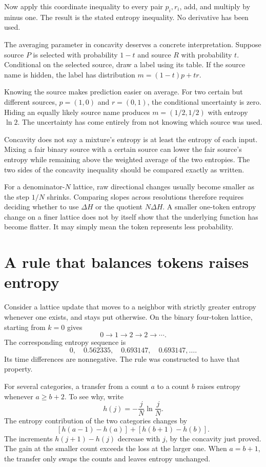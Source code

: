 \documentclass[11pt,oneside,openany]{book}
\theoremstyle{definition}
\theoremstyle{remark}
\numberwithin{equation}{chapter}
\begin{document}
Now apply this coordinate inequality to every pair \(p_i,r_i\), add, and multiply by minus one. The result is the stated entropy inequality. No derivative has been used.

The averaging parameter in concavity deserves a concrete interpretation. Suppose source \(P\) is selected with probability \(1-t\) and source \(R\) with probability \(t\). Conditional on the selected source, draw a label using its table. If the source name is hidden, the label has distribution \(m=(1-t)p+tr\).

Knowing the source makes prediction easier on average. For two certain but different sources, \(p=(1,0)\) and \(r=(0,1)\), the conditional uncertainty is zero. Hiding an equally likely source name produces \(m=(1/2,1/2)\) with entropy \(\ln2\). The uncertainty has come entirely from not knowing which source was used.

Concavity does not say a mixture's entropy is at least the entropy of each input. Mixing a fair binary source with a certain source can lower the fair source's entropy while remaining above the weighted average of the two entropies. The two sides of the concavity inequality should be compared exactly as written.

For a denominator-\(N\) lattice, raw directional changes usually become smaller as the step \(1/N\) shrinks. Comparing slopes across resolutions therefore requires deciding whether to use \(\Delta H\) or the quotient \(N\Delta H\). A smaller one-token entropy change on a finer lattice does not by itself show that the underlying function has become flatter. It may simply mean the token represents less probability.

\section{A rule that balances tokens raises entropy}\label{ch05-a-rule-that-balances-tokens-raises-entropy}

Consider a lattice update that moves to a neighbor with strictly greater entropy whenever one exists, and stays put otherwise. On the binary four-token lattice, starting from \(k=0\) gives \[0\to1\to2\to2\to\cdots.\] The corresponding entropy sequence is \[0,\quad0.562335,\quad0.693147,\quad0.693147,\ldots.\] Its time differences are nonnegative. The rule was constructed to have that property.

For several categories, a transfer from a count \(a\) to a count \(b\) raises entropy whenever \(a\geq b+2\). To see why, write \[h(j)=-\frac jN\ln\frac jN.\] The entropy contribution of the two categories changes by \[[h(a-1)-h(a)]+[h(b+1)-h(b)].\] The increments \(h(j+1)-h(j)\) decrease with \(j\), by the concavity just proved. The gain at the smaller count exceeds the loss at the larger one. When \(a=b+1\), the transfer only swaps the counts and leaves entropy unchanged.
\end{document}
